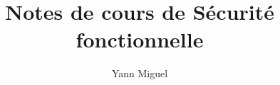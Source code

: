 \documentclass[a4paper, 12pt]{article}
\title{Notes de cours de S\'ecurit\'e fonctionnelle}
\author{Yann Miguel}
\begin{document}
\ttfamily
\maketitle
\tableofcontents
\newpage


\newpage



\end{document}
